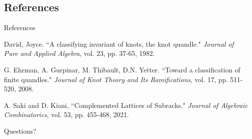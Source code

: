 \documentclass[10pt]{beamer}
\theoremstyle{plain}
\begin{document}

\subsection{References}
\begin{frame}{References}
\begin{thebibliography}{10}

    David, Joyce. ``A classifying invariant of knots, the knot quandle." \emph{Journal of Pure and Applied Algebra}, vol. 23, pp. 37-65, 1982.

    G. Ehrman, A. Gurpinar, M. Thibault, D.N. Yetter. ``Toward a classification of finite quandles." \emph{Journal of Knot Theory and Its Ramifications}, vol. 17, pp. 511-520, 2008.

    A. Saki and D. Kiani, ``Complemented Lattices of Subracks." \emph{Journal of Algebraic Combinatorics}, vol. 53, pp. 455-468, 2021.
\end{thebibliography}
\end{frame}

\begin{frame}
\begin{center}
    \huge Questions?
\end{center}
   
\end{frame}

\end{document}
